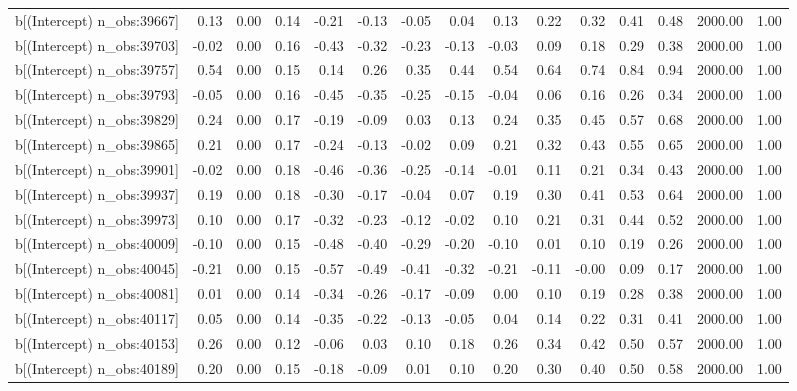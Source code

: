 \begin{table}[ht]
\begin{tabular}{rrrrrrrrrrrrrrr}
  b[(Intercept) n\_obs:39667] & 0.13 & 0.00 & 0.14 & -0.21 & -0.13 & -0.05 & 0.04 & 0.13 & 0.22 & 0.32 & 0.41 & 0.48 & 2000.00 & 1.00 \\ 
  b[(Intercept) n\_obs:39703] & -0.02 & 0.00 & 0.16 & -0.43 & -0.32 & -0.23 & -0.13 & -0.03 & 0.09 & 0.18 & 0.29 & 0.38 & 2000.00 & 1.00 \\ 
  b[(Intercept) n\_obs:39757] & 0.54 & 0.00 & 0.15 & 0.14 & 0.26 & 0.35 & 0.44 & 0.54 & 0.64 & 0.74 & 0.84 & 0.94 & 2000.00 & 1.00 \\ 
  b[(Intercept) n\_obs:39793] & -0.05 & 0.00 & 0.16 & -0.45 & -0.35 & -0.25 & -0.15 & -0.04 & 0.06 & 0.16 & 0.26 & 0.34 & 2000.00 & 1.00 \\ 
  b[(Intercept) n\_obs:39829] & 0.24 & 0.00 & 0.17 & -0.19 & -0.09 & 0.03 & 0.13 & 0.24 & 0.35 & 0.45 & 0.57 & 0.68 & 2000.00 & 1.00 \\ 
  b[(Intercept) n\_obs:39865] & 0.21 & 0.00 & 0.17 & -0.24 & -0.13 & -0.02 & 0.09 & 0.21 & 0.32 & 0.43 & 0.55 & 0.65 & 2000.00 & 1.00 \\ 
  b[(Intercept) n\_obs:39901] & -0.02 & 0.00 & 0.18 & -0.46 & -0.36 & -0.25 & -0.14 & -0.01 & 0.11 & 0.21 & 0.34 & 0.43 & 2000.00 & 1.00 \\ 
  b[(Intercept) n\_obs:39937] & 0.19 & 0.00 & 0.18 & -0.30 & -0.17 & -0.04 & 0.07 & 0.19 & 0.30 & 0.41 & 0.53 & 0.64 & 2000.00 & 1.00 \\ 
  b[(Intercept) n\_obs:39973] & 0.10 & 0.00 & 0.17 & -0.32 & -0.23 & -0.12 & -0.02 & 0.10 & 0.21 & 0.31 & 0.44 & 0.52 & 2000.00 & 1.00 \\ 
  b[(Intercept) n\_obs:40009] & -0.10 & 0.00 & 0.15 & -0.48 & -0.40 & -0.29 & -0.20 & -0.10 & 0.01 & 0.10 & 0.19 & 0.26 & 2000.00 & 1.00 \\ 
  b[(Intercept) n\_obs:40045] & -0.21 & 0.00 & 0.15 & -0.57 & -0.49 & -0.41 & -0.32 & -0.21 & -0.11 & -0.00 & 0.09 & 0.17 & 2000.00 & 1.00 \\ 
  b[(Intercept) n\_obs:40081] & 0.01 & 0.00 & 0.14 & -0.34 & -0.26 & -0.17 & -0.09 & 0.00 & 0.10 & 0.19 & 0.28 & 0.38 & 2000.00 & 1.00 \\ 
  b[(Intercept) n\_obs:40117] & 0.05 & 0.00 & 0.14 & -0.35 & -0.22 & -0.13 & -0.05 & 0.04 & 0.14 & 0.22 & 0.31 & 0.41 & 2000.00 & 1.00 \\ 
  b[(Intercept) n\_obs:40153] & 0.26 & 0.00 & 0.12 & -0.06 & 0.03 & 0.10 & 0.18 & 0.26 & 0.34 & 0.42 & 0.50 & 0.57 & 2000.00 & 1.00 \\ 
  b[(Intercept) n\_obs:40189] & 0.20 & 0.00 & 0.15 & -0.18 & -0.09 & 0.01 & 0.10 & 0.20 & 0.30 & 0.40 & 0.50 & 0.58 & 2000.00 & 1.00 \\ 

\end{tabular}
\end{table}

